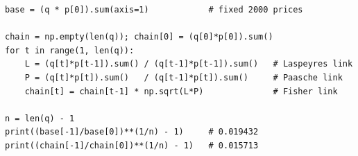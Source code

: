 \documentclass[12pt, letterpaper]{article}
\begin{document}
\begin{tcolorbox}[oddbox,title={Problem 1.3 \quad Chained GDP}]
\begin{tcolorbox}[theorybox,title={Verification code (executed)}]
\begin{verbatim}
base = (q * p[0]).sum(axis=1)            # fixed 2000 prices

chain = np.empty(len(q)); chain[0] = (q[0]*p[0]).sum()
for t in range(1, len(q)):
    L = (q[t]*p[t-1]).sum() / (q[t-1]*p[t-1]).sum()   # Laspeyres link
    P = (q[t]*p[t]).sum()   / (q[t-1]*p[t]).sum()     # Paasche link
    chain[t] = chain[t-1] * np.sqrt(L*P)              # Fisher link

n = len(q) - 1
print((base[-1]/base[0])**(1/n) - 1)     # 0.019432
print((chain[-1]/chain[0])**(1/n) - 1)   # 0.015713
\end{verbatim}
\end{tcolorbox}
\end{tcolorbox}

\end{document}
